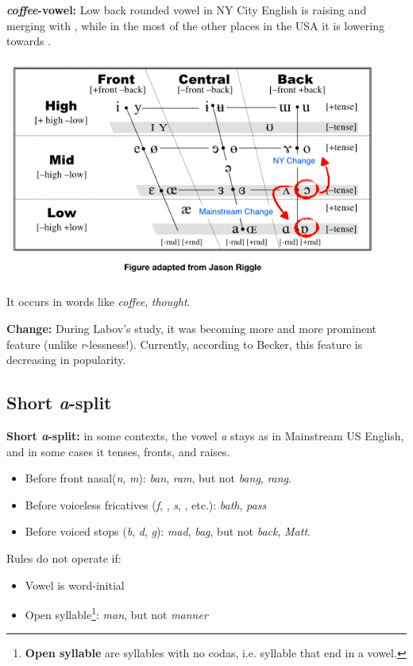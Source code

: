 \documentclass[11pt]{article}
\newcommand{\1}{$'$}
\newcommand{\2}{$''$}
\newcommand{\3}{$'''$}
\begin{document}
\textbf{\emph{coffee}-vowel:} Low back rounded vowel \textipa{[0]} in NY City English is raising and merging with \textipa{[o]}, while in the most of the other places in the USA it is lowering towards \textipa{[6]}.

\begin{center}
	\includegraphics[width=.7\textwidth]{coffee.png}	
\end{center}

	\noindent It occurs in words like \emph{coffee}, \emph{thought}.
	
\noindent \textbf{Change:} During Labov's study, it was becoming more and more prominent feature (unlike \emph{r}-lessness!). Currently, according to Becker, this feature is decreasing in popularity.

\subsection{Short \emph{a}-split}

\textbf{Short \emph{a}-split:} in some contexts, the vowel \emph{a} stays as in Mainstream US English, and in some cases it tenses, fronts, and raises. 

	\begin{itemize}
		\item Before front nasal(\emph{n}, \emph{m}): \emph{ban}, \emph{ram}, but not \emph{bang}, \emph{rang}.
		\item Before voiceless fricatives (\emph{f}, \emph{}, \emph{s}, \emph{}, etc.): \emph{bath}, \emph{pass}
		\item Before voiced stops (\emph{b}, \emph{d}, \emph{g}): \emph{mad}, \emph{bag}, but not \emph{back}, \emph{Matt}.
	\end{itemize}
	
	Rules do not operate if:
	\begin{itemize}
		\item Vowel is word-initial
		\item Open syllable\footnote{\textbf{Open syllable} are syllables with no codas, i.e. syllable that end in a vowel.}: \emph{man}, but not \emph{manner}
	\end{itemize}
\end{document}
